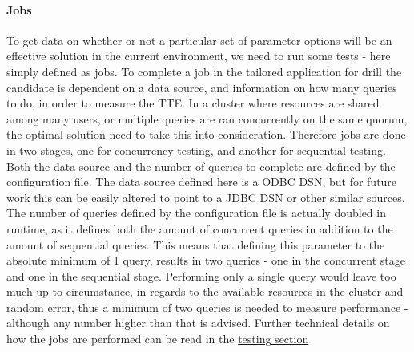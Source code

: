\documentclass[a4paper,english]{report}
\begin{document}
		\paragraph{Jobs}
		To get data on whether or not a particular set of parameter options will be an effective solution in the current environment, we need to run some tests - here simply defined as jobs. To complete a job in the tailored application for drill the candidate is dependent on a data source, and information on how many queries to do, in order to measure the TTE. In a cluster where resources are shared among many users, or multiple queries are ran concurrently on the same quorum, the optimal solution need to take this into consideration. Therefore jobs are done in two stages, one for concurrency testing, and another for sequential testing. Both the data source and the number of queries to complete are defined by the configuration file. The data source defined here is a ODBC DSN, but for future work this can be easily altered to point to a JDBC DSN or other similar sources. The number of queries defined by the configuration file is actually doubled in runtime, as it defines both the amount of concurrent queries in addition to the amount of sequential queries. This means that defining this parameter to the absolute minimum of 1 query, results in two queries - one in the concurrent stage and one in the sequential stage. Performing only a single query would leave too much up to circumstance, in regards to the available resources in the cluster and random error, thus a minimum of two queries is needed to measure performance - although any number higher than that is advised. Further technical details on how the jobs are performed can be read in the \hyperref[sec:jobs]{testing section}
		\pagebreak
\end{document}
